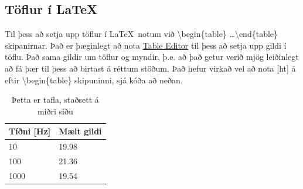 \documentclass[a4paper]{article}
\begin{document}
\begin{minipage}{\linewidth} %
\end{minipage}



\subsection{Töflur í \LaTeX}
Til þess að setja upp töflur í \LaTeX\ notum við \textbackslash begin\{table\} \dots \textbackslash end\{table\} skipanirnar. Það er þæginlegt að nota \href{http://truben.no/table/}{Table Editor} til þess að setja upp gildi í töflu. Það sama gildir um töflur og myndir, þ.e. að það getur verið mjög leiðinlegt að fá þær til þess að birtast á réttum stöðum. Það hefur virkað vel að nota [ht] á eftir  \textbackslash begin\{table\} skipuninni, sjá kóða að neðan.

\begin{table}[ht!] %
\centering	%
    \begin{tabular}{|l|l|}
    \hline
    Tíðni [Hz] & Mælt gildi \\ \hline
    10             & 19.98        \\ \hline
    100            & 21.36        \\ \hline
    1000           & 19.54        \\ \hline
    \end{tabular}
     \caption{Þetta er tafla, staðsett á miðri síðu}
\end{table}
\end{document}
